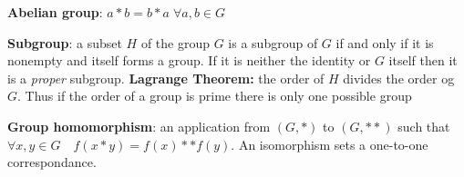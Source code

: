 \begin{squishlist}
    \item \textbf{Abelian group}: $a * b = b * a \; \forall a,b \in G$
    \item \textbf{Subgroup}: a subset $H$ of the group $G$ is a subgroup of $G$ if and only if it
    is nonempty and itself forms a group. If it is neither the identity or $G$ itself then it is a \emph{proper} subgroup. \textbf{Lagrange Theorem:} the order of $H$ divides the order og $G$. Thus if the order of a group is prime there is only one possible group

    \item \textbf{Group homomorphism}: an application from $(G, *)$ to $(G, **)$ such that $\forall x,y \in G \quad f(x * y) = f(x) ** f(y)$. An isomorphism sets a one-to-one correspondance.
    
\end{squishlist}


